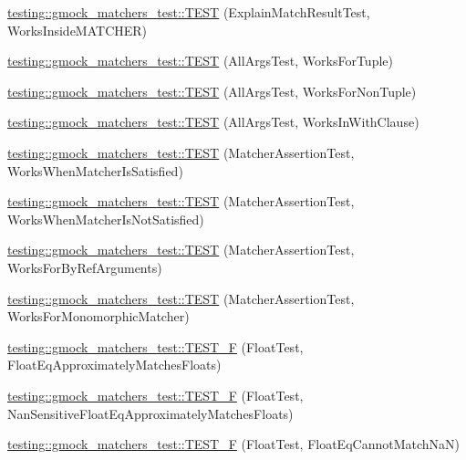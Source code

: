 \begin{DoxyCompactItemize}
\item 
\hyperlink{namespacetesting_1_1gmock__matchers__test_ae57edef8890da6b929dd0d21c2f7c071}{testing\+::gmock\+\_\+matchers\+\_\+test\+::\+T\+E\+ST} (Explain\+Match\+Result\+Test, Works\+Inside\+M\+A\+T\+C\+H\+ER)
\item 
\hyperlink{namespacetesting_1_1gmock__matchers__test_aeea300647af4c7611f4e491cabcbf950}{testing\+::gmock\+\_\+matchers\+\_\+test\+::\+T\+E\+ST} (All\+Args\+Test, Works\+For\+Tuple)
\item 
\hyperlink{namespacetesting_1_1gmock__matchers__test_aacc3ed6d6a0f9ff552019d0d58817b6f}{testing\+::gmock\+\_\+matchers\+\_\+test\+::\+T\+E\+ST} (All\+Args\+Test, Works\+For\+Non\+Tuple)
\item 
\hyperlink{namespacetesting_1_1gmock__matchers__test_ad62534535946b2ef45457fb653f73a98}{testing\+::gmock\+\_\+matchers\+\_\+test\+::\+T\+E\+ST} (All\+Args\+Test, Works\+In\+With\+Clause)
\item 
\hyperlink{namespacetesting_1_1gmock__matchers__test_ad37559f9112c04334a62ce9617cf1349}{testing\+::gmock\+\_\+matchers\+\_\+test\+::\+T\+E\+ST} (Matcher\+Assertion\+Test, Works\+When\+Matcher\+Is\+Satisfied)
\item 
\hyperlink{namespacetesting_1_1gmock__matchers__test_a2f3755be7052d6e7769e3323053399d0}{testing\+::gmock\+\_\+matchers\+\_\+test\+::\+T\+E\+ST} (Matcher\+Assertion\+Test, Works\+When\+Matcher\+Is\+Not\+Satisfied)
\item 
\hyperlink{namespacetesting_1_1gmock__matchers__test_afcf1287c7fd759157367026613ddd727}{testing\+::gmock\+\_\+matchers\+\_\+test\+::\+T\+E\+ST} (Matcher\+Assertion\+Test, Works\+For\+By\+Ref\+Arguments)
\item 
\hyperlink{namespacetesting_1_1gmock__matchers__test_a0fe4bde05f667c4877e3b4a4a7bde002}{testing\+::gmock\+\_\+matchers\+\_\+test\+::\+T\+E\+ST} (Matcher\+Assertion\+Test, Works\+For\+Monomorphic\+Matcher)
\item 
\hyperlink{namespacetesting_1_1gmock__matchers__test_a69257e935b4334c835b3ad26acea9104}{testing\+::gmock\+\_\+matchers\+\_\+test\+::\+T\+E\+S\+T\+\_\+F} (Float\+Test, Float\+Eq\+Approximately\+Matches\+Floats)
\item 
\hyperlink{namespacetesting_1_1gmock__matchers__test_abb691880cd22f6f444c978547b13f792}{testing\+::gmock\+\_\+matchers\+\_\+test\+::\+T\+E\+S\+T\+\_\+F} (Float\+Test, Nan\+Sensitive\+Float\+Eq\+Approximately\+Matches\+Floats)
\item 
\hyperlink{namespacetesting_1_1gmock__matchers__test_a111f0c8a5ec17b47e8eb6226e1c2cb58}{testing\+::gmock\+\_\+matchers\+\_\+test\+::\+T\+E\+S\+T\+\_\+F} (Float\+Test, Float\+Eq\+Cannot\+Match\+NaN)

\end{DoxyCompactItemize}
